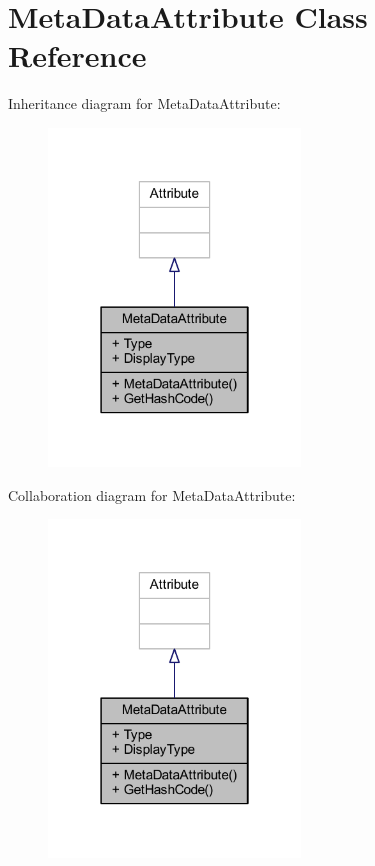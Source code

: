\hypertarget{class_meta_data_attribute}{}\section{Meta\+Data\+Attribute Class Reference}
\label{class_meta_data_attribute}


Inheritance diagram for Meta\+Data\+Attribute\+:\nopagebreak
\begin{figure}[H]
\begin{center}
\leavevmode
\includegraphics[width=190pt]{class_meta_data_attribute__inherit__graph}
\end{center}
\end{figure}


Collaboration diagram for Meta\+Data\+Attribute\+:\nopagebreak
\begin{figure}[H]
\begin{center}
\leavevmode
\includegraphics[width=190pt]{class_meta_data_attribute__coll__graph}
\end{center}
\end{figure}
